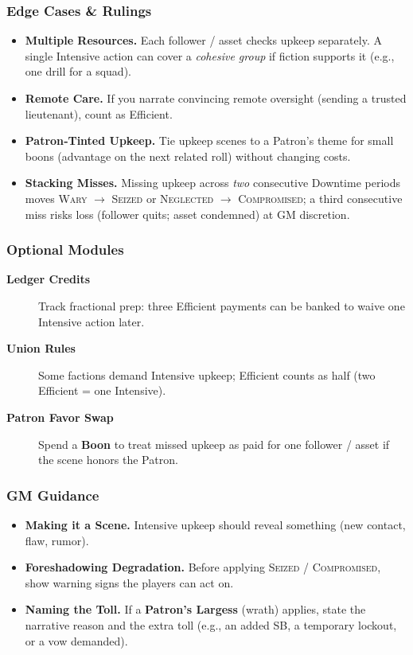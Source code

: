 \subsubsection{Edge Cases \& Rulings}\label{subsec:upkeep_edge}
\begin{itemize}
    \item \textbf{Multiple Resources.} Each follower / asset checks upkeep separately. A single Intensive action can cover a \emph{cohesive group} if fiction supports it (e.g., one drill for a squad).
    \item \textbf{Remote Care.} If you narrate convincing remote oversight (sending a trusted lieutenant), count as Efficient.
    \item \textbf{Patron‑Tinted Upkeep.} Tie upkeep scenes to a Patron's theme for small boons (advantage on the next related roll) without changing costs.
    \item \textbf{Stacking Misses.} Missing upkeep across \emph{two} consecutive Downtime periods moves \textsc{Wary} $\rightarrow$ \textsc{Seized} or \textsc{Neglected} $\rightarrow$ \textsc{Compromised}; a third consecutive miss risks loss (follower quits; asset condemned) at GM discretion.
\end{itemize}

\subsubsection{Optional Modules}\label{subsec:upkeep_modules}

\begin{description}
    \item[\textbf{Ledger Credits}] Track fractional prep: three Efficient payments can be banked to waive one Intensive action later.
    \item[\textbf{Union Rules}] Some factions demand Intensive upkeep; Efficient counts as half (two Efficient = one Intensive).
    \item[\textbf{Patron Favor Swap}] Spend a \textbf{Boon} to treat missed upkeep as paid for one follower / asset if the scene honors the Patron.
\end{description}

\subsubsection{GM Guidance}\label{subsec:upkeep_gm}
\begin{itemize}
    \item \textbf{Making it a Scene.} Intensive upkeep should reveal something (new contact, flaw, rumor).
    \item \textbf{Foreshadowing Degradation.} Before applying \textsc{Seized} / \textsc{Compromised}, show warning signs the players can act on.
    \item \textbf{Naming the Toll.} If a \textbf{Patron's Largess} (wrath) applies, state the narrative reason and the extra toll (e.g., an added SB, a temporary lockout, or a vow demanded).
\end{itemize}

